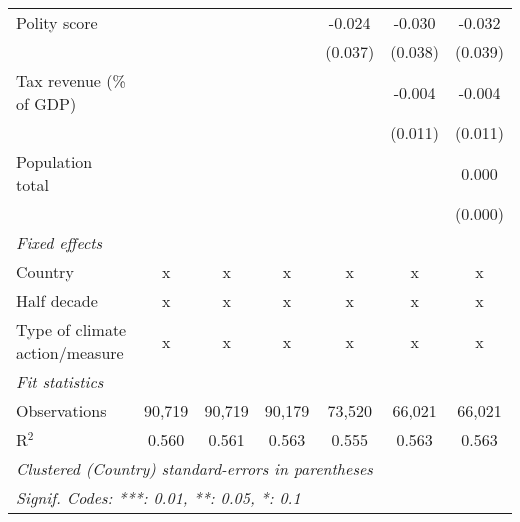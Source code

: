 \begin{tabular}{lcccccc}
   Polity score                                              &         &                &                & -0.024         & -0.030        & -0.032\\   
                                                             &         &                &                & (0.037)        & (0.038)       & (0.039)\\   
   Tax revenue (\% of GDP)                                   &         &                &                &                & -0.004        & -0.004\\   
                                                             &         &                &                &                & (0.011)       & (0.011)\\   
   Population total                                          &         &                &                &                &               & 0.000\\   
                                                             &         &                &                &                &               & (0.000)\\   
   \emph{Fixed effects}\\
   Country                                                   & x       & x              & x              & x              & x             & x\\  
   Half decade                                               & x       & x              & x              & x              & x             & x\\  
   Type of climate action/measure                            & x       & x              & x              & x              & x             & x\\  
   \midrule \emph{Fit statistics}\\
   Observations                                              & 90,719  & 90,719         & 90,179         & 73,520         & 66,021        & 66,021\\  
   R$^2$                                                     & 0.560   & 0.561          & 0.563          & 0.555          & 0.563         & 0.563\\  
   \midrule
   \multicolumn{7}{l}{\emph{Clustered (Country) standard-errors in parentheses}}\\
   \multicolumn{7}{l}{\emph{Signif. Codes: ***: 0.01, **: 0.05, *: 0.1}}\\
\end{tabular}
\par\endgroup


